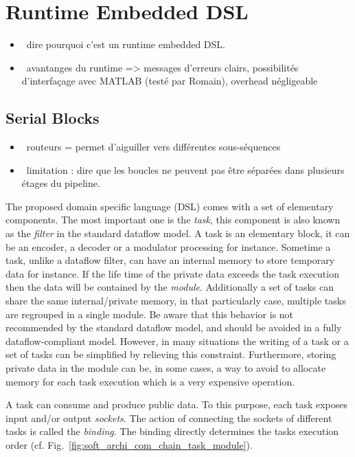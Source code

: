 \section{Runtime Embedded DSL}

\begin{itemize}
  \item \xmark~dire pourquoi c'est un runtime embedded DSL.
  \item \xmark~avantanges du runtime => messages d'erreurs clairs, possibilités
    d'interfaçage avec MATLAB (testé par Romain), overhead négligeable
\end{itemize}

\subsection{Serial Blocks}

\begin{itemize}
  \item \xmark~routeurs = permet d'aiguiller vers différentes sous-séquences
  \item \xmark~limitation : dire que les boucles ne peuvent pas être séparées
    dans plusieurs étages du pipeline.
\end{itemize}

The proposed domain specific language (DSL) comes with a set of elementary
components. The most important one is the \emph{task}, this component is also
known as the \emph{filter} in the standard dataflow model. A task is an
elementary block, it can be an encoder, a decoder or a modulator processing for
instance. Sometime a task, unlike a dataflow filter, can have an internal memory
to store temporary data for instance. If the life time of the private data
exceeds the task execution then the data will be contained by the \emph{module}.
Additionally a set of tasks can share the same internal/private memory, in that
particularly case, multiple tasks are regrouped in a single module. Be aware
that this behavior is not recommended by the standard dataflow model, and should
be avoided in a fully dataflow-compliant model. However, in many situations the
writing of a task or a set of tasks can be simplified by relieving this
constraint. Furthermore, storing private data in the module can be, in some
cases, a way to avoid to allocate memory for each task execution which is a very
expensive operation.

A task can consume and produce public data. To this purpose, each task exposes
input and/or output \emph{sockets}. The action of connecting the sockets of
different tasks is called the \emph{binding}. The binding directly determines
the tasks execution order (cf. Fig.~\ref{fig:soft_archi_com_chain_task_module}).

